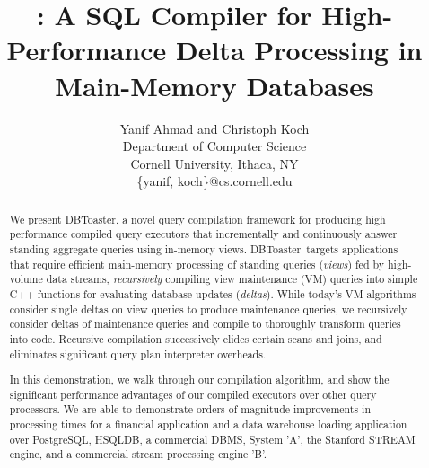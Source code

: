 \documentclass{vldb}
\title{\compiler: A SQL Compiler for High-Performance Delta Processing in
Main-Memory Databases}
\author{Yanif Ahmad and Christoph Koch \\
Department of Computer Science \\ Cornell University, Ithaca, NY \\
\{yanif, koch\}@cs.cornell.edu}
\date{}
\newcommand{\comment}[1]{}
\newcommand{\compiler}{DBToaster}
\begin{document}
\maketitle

\begin{abstract}
We present \compiler, a novel query compilation framework for producing high
performance compiled query executors that incrementally and continuously answer
standing aggregate queries using in-memory views. \compiler\ targets applications
that require efficient main-memory processing of standing queries
(\textit{views}) fed by high-volume data streams, \textit{recursively} compiling
view maintenance (VM) queries into simple C++ functions for evaluating database
updates (\textit{deltas}).
While today's VM algorithms consider single deltas on view queries to produce
maintenance queries, we recursively consider deltas of maintenance queries and
compile to thoroughly transform queries into code. Recursive compilation
successively elides certain scans and joins, and eliminates significant query
plan interpreter overheads.
\comment{
Our compilation process models and implements group-by aggregates as
an associative map data structure, and obtains procedures to update these maps by
applying a set of map expression rewrites, which can then easily be turned into
C++ code.
}

In this demonstration, we walk through our compilation algorithm, and show the
significant performance advantages of our compiled executors over other query
processors. We are able to demonstrate orders of magnitude improvements in
processing times for a financial application and a data warehouse loading
application over PostgreSQL, HSQLDB, a commercial DBMS, System 'A', the Stanford
STREAM engine, and a commercial stream processing engine 'B'.
\end{abstract}









\end{document}
